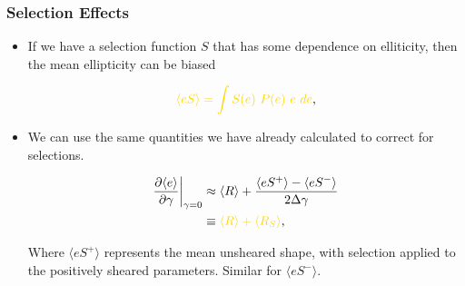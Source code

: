 \documentclass{beamer}
\newcommand{\mest}{e}
\newcommand{\mcalRS}{$R_{S}$}
\begin{document}
\frame
{
    \frametitle{Selection Effects}

 
    \begin{itemize}

        \item If we have a selection function $S$ that has some dependence
            on elliticity, then the mean ellipticity
            can be biased

            \begin{align}
                {\color{gold} \langle \mest S \rangle = \int S(\mest)~P(\mest)~\mest~d\mest},
            \end{align}


        \item We can use the same quantities we have already calculated
            to correct for selections. 

            \begin{align}
                \frac{\partial \langle \mest \rangle}{\partial \gamma}\bigg|_{\gamma=0} &\approx
                \langle R \rangle + \frac{\langle \mest S^+ \rangle - \langle \mest S^- \rangle}{2 \Delta \gamma} \nonumber \\
                &\equiv {\color{gold} \langle R \rangle + \langle \mbox{\mcalRS} \rangle},
            \end{align}

            Where $\langle e S^+ \rangle$ represents the mean unsheared shape, with selection
            applied to the positively sheared parameters.  Similar for $\langle e S^- \rangle$.

    \end{itemize}

}
\end{document}
